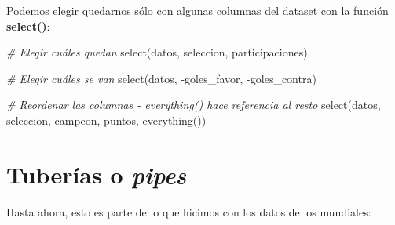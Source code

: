 \documentclass[
]{book}
\newenvironment{Shaded}{\begin{snugshade}}{\end{snugshade}}
\newcommand{\CommentTok}[1]{\textcolor[rgb]{0.56,0.35,0.01}{\textit{#1}}}
\newcommand{\FunctionTok}[1]{\textcolor[rgb]{0.00,0.00,0.00}{#1}}
\newcommand{\NormalTok}[1]{#1}
\newcommand{\SpecialCharTok}[1]{\textcolor[rgb]{0.00,0.00,0.00}{#1}}
\begin{document}
Podemos elegir quedarnos sólo con algunas columnas del dataset con la función \textbf{select()}:

\begin{Shaded}
\begin{Highlighting}[]
\CommentTok{\# Elegir cuáles quedan}
\FunctionTok{select}\NormalTok{(datos, seleccion, participaciones)}

\CommentTok{\# Elegir cuáles se van}
\FunctionTok{select}\NormalTok{(datos, }\SpecialCharTok{{-}}\NormalTok{goles\_favor, }\SpecialCharTok{{-}}\NormalTok{goles\_contra)}

\CommentTok{\# Reordenar las columnas {-} everything() hace referencia al resto}
\FunctionTok{select}\NormalTok{(datos, seleccion, campeon, puntos, }\FunctionTok{everything}\NormalTok{())}
\end{Highlighting}
\end{Shaded}

\hypertarget{tuberuxedas-o-pipes}{%
\section{\texorpdfstring{Tuberías o \emph{pipes}}{Tuberías o pipes}}\label{tuberuxedas-o-pipes}}

Hasta ahora, esto es parte de lo que hicimos con los datos de los mundiales:
\end{document}
